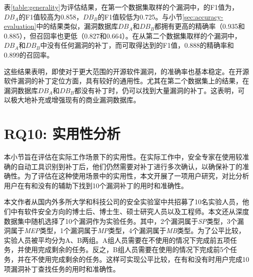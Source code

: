 表\ref{table:generality}为评估结果，在第一个数据集取样的个漏洞中，\tool 的F1值为，$DB_A$的F1值较高为0.858，$DB_B$的F1值较低为0.725。与小节\ref{sec:accuracy-evaluation}中的结果类似，漏洞数据库$DB_A$和$DB_B$都拥有更高的精确率（0.935和0.885），但召回率也更低（0.827和0.664）。在从第二个数据集取样的个漏洞中，$DB_A$和$DB_B$中没有任何漏洞的补丁，而\tool 可取得达到的F1值，0.888的精确率和0.899的召回率。

这些结果表明，即使对于更大范围的开源软件漏洞，\tool 的准确率也基本稳定。在开源软件漏洞的补丁定位方面，\tool 具有较好的通用性。尤其在第二个数据集上的结果，在漏洞数据库$DB_A$和$DB_B$都没有补丁时，\tool 仍可以找到大量漏洞的补丁。这表明，\tool 可以极大地补充或增强现有的商业漏洞数据库。



\section{RQ10: 实用性分析}\label{sec:usefulness}
本小节旨在评估\tool 在实际工作场景下的实用性。在实际工作中，安全专家在使用较准确的自动工具识别到补丁后，他们仍然需要对补丁进行多次确认，以确保补丁的准确性。为了评估\tool 在这种使用场景中的实用性，本文开展了一项用户研究，对比分析用户在有和没有\tool 的辅助下找到10个漏洞补丁的用时和准确性。

本文作者从国内外多所大学和科技公司的安全实验室中共招募了10名实验人员，他们中有软件安全方向的博士后、博士生、硕士研究人员以及工程师。本文还从深度数据集中随机选择了10个漏洞作为实验任务。其中，2个漏洞属于\textit{SP}类型，3个漏洞属于\textit{MEP}类型，1个漏洞属于\textit{MP}类型，4个漏洞属于\textit{MB}类型。为了公平比较，实验人员被平均分为A、B两组。A组人员需要在不使用\tool 的情况下完成前五项任务，并使用\tool 完成剩余的任务。反之，B组人员需要在使用\tool 的情况下完成前5个任务，并在不使用\tool 完成剩余的任务。这样可实现公平比较，在有和没有\tool 时用户完成10项漏洞补丁查找任务的用时和准确性。

